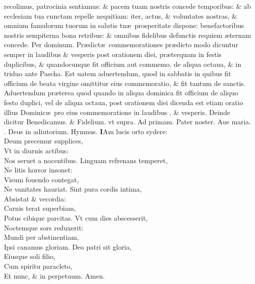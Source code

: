 \documentclass[a5paper,10pt]{book}
\makeatletter
\DeclareRobustCommand{\Vbar}{\vers@resp{-0.1em}{V}}
\newcommand{\vers@resp@sym}{\raisebox{0.2ex}{\rotatebox[origin=c]{-20}{$\m@th\rceil$}}}
\newcommand{\vers@resp}[2]{%
  {\ooalign{\hidewidth\kern#1\vers@resp@sym\hidewidth\cr#2\cr}}%
}%
\def\ae{æ}
\makeatother
\begin{document}
\begin{multicols*}{2}
recolimus, patrocinia sentiamus: \& pacem tuam nostris concede temporibus: \& ab ecclesiam tua cunctam repelle nequitiam: iter, actus, \& voluntates nostras, \& omnium famulorum tuorum in salutis tu\ae \ prosperitate dispone: benefactoribus nostris sempiterna bona retribue: \& omnibus fidelibus defunctis requiem \ae ternam concede. Per dominum.
\newline {} \color{red} Pr\ae dict\ae \ commemorationes pr\ae dicto modo dicuntur semper in laudibus \& vesperis post orationem diei, pr\ae terquam in festis duplicibus, \& quandocunque fit officium aut commemo. de aliqua octaua, \& in triduo ante Pascha. Est uatem aduertendum, quod in sabbatis in quibus fit officium de beata virgine omittitur eius commemoratio, \& fit tantum de sanctis. Aduertendum pr\ae terea quod quando in aliqua dominica fit officium de aliquo festo duplici, vel de aliqua octaua, post orationem diei dicenda est etiam oratio illius Dominic\ae \ pro eius commemoratione in laudibus , \& vesperis. Deinde dicitur \color{black} Benedicamus. \color{red} \& \color{black} Fidelium. \color{red} vt supra. Ad \hypertarget{DOM-PRIMA-ADV-PRIM}{primam.} \color{black}
Pater noster. Aue maria. \color{red} \Vbar . \color{black} Deus in adiutorium. \color{red} Hymnus. \color{black}
\vspace{-.25em}
\lettrine[lines=2]{\bfseries \color{red} I}{}Am lucis orto sydere:\\Deum precemur supplices,\\Vt in diurnis actibus:\\Nos seruet a nocentibus.
\newline \color{red} L\color{black}inguam refrenans temperet,\\Ne litis horror insonet:\\Visum fouendo contegat,\\Ne vanitates hauriat.
\newline \color{red} S\color{black}int pura cordis intima,\\Absistat \& vecordia:\\Carnis terat superbiam,\\Potus cibique parcitas.
\newline \color{red} V\color{black}t cum dies abscesserit,\\Noctemque sors reduxerit:\\Mundi per abstinentiam,\\Ipsi canamus gloriam.
\newline \color{red} D\color{black}eo patri sit gloria,\\Eiusque soli filio,\\Cum spiritu paracleto,\\Et nunc, \& in perpetuum. Amen.

\end{multicols*}
\end{document}
